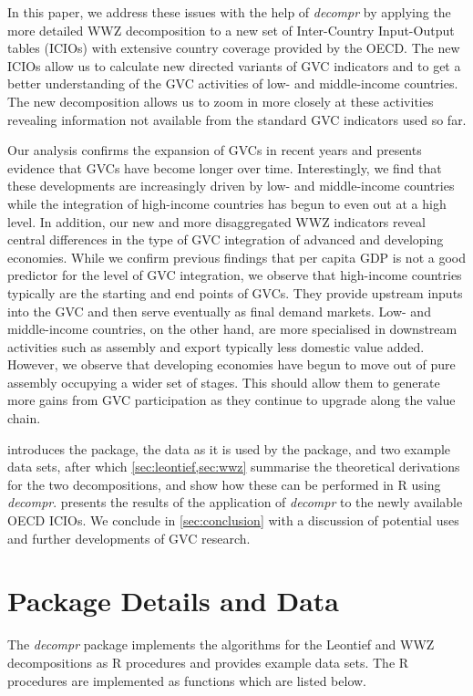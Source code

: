 \documentclass[a4paper,11pt]{article}
\begin{document}
In this paper, we address these issues with the help of \textit{decompr} by applying the more detailed WWZ decomposition to a new set of Inter-Country Input-Output tables (ICIOs) with extensive country coverage provided by the OECD. The new ICIOs allow us to calculate new directed variants of GVC indicators and to get a better understanding of the GVC activities of low- and middle-income countries. The new decomposition allows us to zoom in more closely at these activities revealing information not available from the standard GVC indicators used so far.

Our analysis confirms the expansion of GVCs in recent years and presents evidence that GVCs have become longer over time. Interestingly, we find that these developments are increasingly driven by low- and middle-income countries while the integration of high-income countries has begun to even out at a high level. In addition, our new and more disaggregated WWZ indicators reveal central differences in the type of GVC integration of advanced and developing economies. While we confirm previous findings that per capita GDP is not a good predictor for the level of GVC integration, we observe that high-income countries typically are the starting and end points of GVCs. They provide upstream inputs into the GVC and then serve eventually as final demand markets. Low- and middle-income countries, on the other hand, are more specialised in downstream activities such as assembly and export typically less domestic value added. However, we observe that developing economies have begun to move out of pure assembly occupying a wider set of stages. This should allow them to generate more gains from GVC participation as they continue to upgrade along the value chain.

 introduces the package, the data as it is used by the package, and two example data sets, after which \cref{sec:leontief,sec:wwz} summarise the theoretical derivations for the two decompositions, and show how these can be performed in R using \textit{decompr}.  presents the results of the application of \textit{decompr} to the newly available OECD ICIOs. We conclude in \cref{sec:conclusion} with a discussion of potential uses and further developments of GVC research.

\section{Package Details and Data}
\label{sec:data}
The \textit{decompr} package implements the algorithms for the Leontief and WWZ decompositions as R procedures and provides example data sets. The R procedures are implemented as functions which are listed below.
\end{document}
